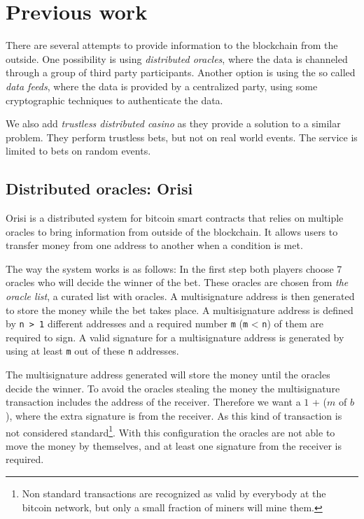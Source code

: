 \section{Previous work} \label{sec:previous_work}

There are several attempts to provide information to the blockchain from the
  outside.
One possibility is using  \textit{distributed oracles}, where the data is channeled
  through a group of third party participants.
Another option is using the so called \textit{data feeds}, where the data is provided
  by a centralized party, using some cryptographic techniques to authenticate
  the data.

We also add \textit{trustless distributed casino} as they provide a solution to a
  similar problem.
They perform trustless bets, but not on real world events.
The service is limited to bets on random events.

\subsection{Distributed oracles: Orisi}
Orisi \cite{orisiwhitepaper} is a distributed system for bitcoin smart
  contracts that relies on multiple oracles to bring information from outside
  of the blockchain.
It allows users to transfer money from one address to another when a condition
  is met.

The way the system works is as follows:
In the first step both players choose 7 oracles who will decide the winner of
  the bet.
These oracles are chosen from \textit{the oracle list}, a curated list with oracles.
A multisignature address is then generated to store the money while the bet
  takes place.
A multisignature address is defined by \texttt{n > 1} different addresses and a
  required number \texttt{m} (\texttt{m} < \texttt{n}) of them are required to
  sign.
A valid signature for a multisignature address is generated by using at least
  \texttt{m} out of these \texttt{n} addresses.

The multisignature address generated will store the money until the oracles
  decide the winner.
To avoid the oracles stealing the money the multisignature transaction includes
  the address of the receiver.
Therefore we want a $1$ + ($m$ of $b$), where the extra signature is
  from the receiver.
As this kind of transaction is not considered
  standard\footnote{Non standard transactions are recognized as valid
  by everybody at the bitcoin network, but only a small fraction of
  miners will mine them.}.
 With this configuration the oracles are
  not able to move the money by themselves, and at least one signature
  from the receiver is required.

